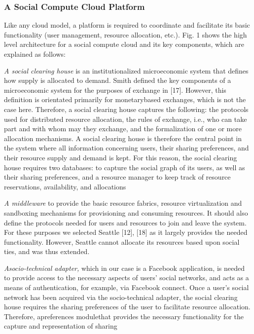 \documentclass[a4paper,12pt]{article}
\begin{document}
	\subsubsection{A Social Compute Cloud Platform}
	Like any cloud model, a platform is required to coordinate
and facilitate its basic functionality (user management,
resource allocation, etc.). Fig. 1 shows the high level architecture for a social compute cloud and its key components,
which are explained as follows:
	\par \textit{A social clearing house} is an institutionalized microeconomic system that defines how supply is allocated to
demand. Smith defined the key components of a microeconomic system for the purposes of exchange in [17]. However, this definition is orientated primarily for monetarybased exchanges, which is not the case here. Therefore, a
social clearing house captures the following: the protocols
used for distributed resource allocation, the rules of
exchange, i.e., who can take part and with whom may they
exchange, and the formalization of one or more allocation
mechanisms. A social clearing house is therefore the central
point in the system where all information concerning users,
their sharing preferences, and their resource supply and
demand is kept. For this reason, the social clearing house
requires two databases: to capture the social graph of its
users, as well as their sharing preferences, and a resource
manager to keep track of resource reservations, availability,
and allocations
	\par \textit{A middleware }to provide the basic resource fabrics,
resource virtualization and sandboxing mechanisms for
provisioning and consuming resources. It should also
define the protocols needed for users and resources to join
and leave the system. For these purposes we selected Seattle
[12], [18] as it largely provides the needed functionality.
However, Seattle cannot allocate its resources based upon
social ties, and was thus extended.
	\par \textit{Asocio-technical adapter,} which in our case is a Facebook
application, is needed to provide access to the necessary
aspects of users’ social networks, and acts as a means of
authentication, for example, via Facebook connect. Once a
user’s social network has been acquired via the socio-technical adapter, the social clearing house requires the sharing
preferences of the user to facilitate resource allocation.
Therefore, apreferences modulethat provides the necessary
functionality for the capture and representation of sharing
\end{document}
